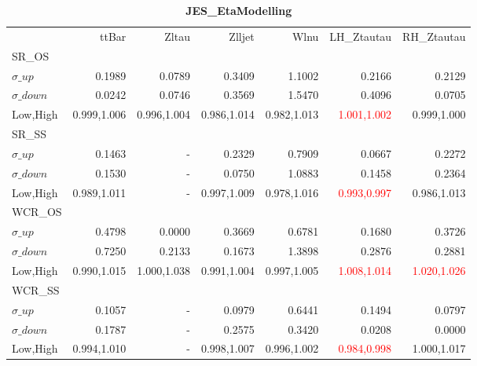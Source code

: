 \documentclass[11pt,oneside,a4paper]{article}
\begin{document}
\begin{table}
\caption{\bf{JES\_EtaModelling}}
\centering
\begin{tabular}{lrrrrrr}
& ttBar & Zltau & Zlljet & Wlnu & LH\_Ztautau & RH\_Ztautau \\

SR\_OS &  &  &  &  &  &  \\
$\sigma\_up$ & 0.1989 & 0.0789 & 0.3409 & 1.1002 & 0.2166 & 0.2129 \\
$\sigma\_down$ & 0.0242 & 0.0746 & 0.3569 & 1.5470 & 0.4096 & 0.0705 \\
Low,High & 0.999,1.006 & 0.996,1.004 & 0.986,1.014 & 0.982,1.013 & \textcolor{red}{1.001,1.002} & 0.999,1.000 \\

\hline
SR\_SS &  &  &  &  &  &  \\
$\sigma\_up$ & 0.1463 & - & 0.2329 & 0.7909 & 0.0667 & 0.2272 \\
$\sigma\_down$ & 0.1530 & - & 0.0750 & 1.0883 & 0.1458 & 0.2364 \\
Low,High & 0.989,1.011 & - & 0.997,1.009 & 0.978,1.016 & \textcolor{red}{0.993,0.997} & 0.986,1.013 \\

\hline
WCR\_OS &  &  &  &  &  &  \\
$\sigma\_up$ & 0.4798 & 0.0000 & 0.3669 & 0.6781 & 0.1680 & 0.3726 \\
$\sigma\_down$ & 0.7250 & 0.2133 & 0.1673 & 1.3898 & 0.2876 & 0.2881 \\
Low,High & 0.990,1.015 & 1.000,1.038 & 0.991,1.004 & 0.997,1.005 & \textcolor{red}{1.008,1.014} & \textcolor{red}{1.020,1.026} \\

\hline
WCR\_SS &  &  &  &  &  &  \\
$\sigma\_up$ & 0.1057 & - & 0.0979 & 0.6441 & 0.1494 & 0.0797 \\
$\sigma\_down$ & 0.1787 & - & 0.2575 & 0.3420 & 0.0208 & 0.0000 \\
Low,High & 0.994,1.010 & - & 0.998,1.007 & 0.996,1.002 & \textcolor{red}{0.984,0.998} & 1.000,1.017 \\

\end{tabular}
\end{table}
\end{document}
